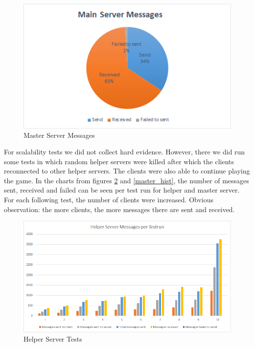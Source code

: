 \begin{figure}[!ht]
\centering
\includegraphics[scale=0.8]{images/master_pie.png}
\caption{Master Server Messages}
\label{master_pie}
\end{figure}

For scalability tests we did not collect hard evidence. 
However, there we did run some tests in which random helper servers were killed after which the clients reconnected to other helper servers.
The clients were also able to continue playing the game.
In the charts from figures \ref{helper_hist} and \ref{master_hist}, the number of messages sent, received and failed can be seen per test run for helper and master server.
For each following test, the number of clients were increased. 
Obvious observation: the more clients, the more messages there are sent and received.

\begin{figure}[!ht]
\centering
\includegraphics[scale=0.8]{images/helper_hist.png}
\caption{Helper Server Tests}
\label{helper_hist}
\end{figure}

